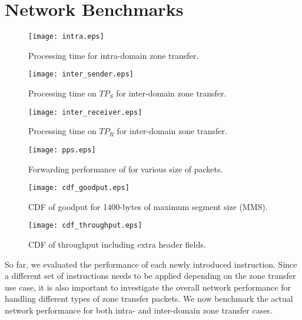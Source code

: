 \section{Network Benchmarks}
\label{sec:networkbenchmark}

\begin{figure}[htb]
	\begin{minipage}{.47\linewidth}
		\centering
		\texttt{[image: intra.eps]}
		\caption{Processing time for intra-domain zone transfer.}
		\label{fig:intra}
	\end{minipage}\hspace{1em}
	\begin{minipage}{.47\linewidth}
		\centering
		\texttt{[image: inter\_sender.eps]}
		\caption{Processing time on $TP_S$ for inter-domain zone transfer.}
		\label{fig:inter_sender}
	\end{minipage}\vspace{2em}
	\begin{minipage}{.47\linewidth}
		\centering
		\texttt{[image: inter\_receiver.eps]}
		\caption{Processing time on $TP_R$ for inter-domain zone transfer.}
		\label{fig:inter_receiver}
	\end{minipage}\hspace{1em}
	\begin{minipage}{.47\linewidth}
		\centering
		\texttt{[image: pps.eps]}
		\caption{Forwarding performance of \tp for various size of packets.}
		\label{fig:forwarding}
	\end{minipage}\vspace{2em}
	\begin{minipage}{.47\linewidth}
		\centering
		\texttt{[image: cdf\_goodput.eps]}
		\caption{CDF of goodput for 1400-bytes of maximum segment size (MMS).}
		\label{fig:goodput}
	\end{minipage}\hspace{1em}
	\begin{minipage}{.47\linewidth}
		\centering
		\texttt{[image: cdf\_throughput.eps]}
		\caption{CDF of throughput including extra header fields.}
		\label{fig:throughput}
	\end{minipage}
\end{figure}

So far, we evaluated the performance of each newly introduced instruction. Since a different
set of instructions needs to be applied depending on the zone transfer use case, it is also
important to investigate the overall network performance for handling different types of zone
transfer packets. We now benchmark the actual network performance for both intra- and inter-domain
zone transfer cases.

